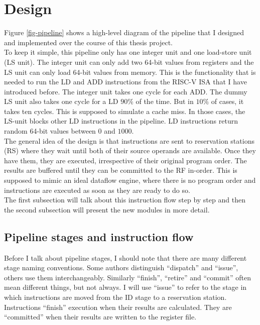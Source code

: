 \documentclass[12pt,a4paper]{article} %
\begin{document}
\section{Design} \label{sec-design}
Figure \ref{fig-pipeline} shows a high-level diagram of the pipeline that I designed and implemented over the course of this thesis project.\\
To keep it simple, this pipeline only has one integer unit and one load-store unit (LS unit). The integer unit can only add two 64-bit values from registers and the LS unit can only load 64-bit values from memory. This is the functionality that is needed to run the LD and ADD instructions from the RISC-V ISA that I have introduced before. The integer unit takes one cycle for each ADD. The dummy LS unit also takes one cycle for a LD $90\%$ of the time. But in $10\%$ of cases, it takes ten cycles. This is supposed to simulate a cache miss. In those cases, the LS-unit blocks other LD instructions in the pipeline. LD instructions return random 64-bit values between $0$ and $1000$. \\

The general idea of the design is that instructions are sent to reservation stations (RS) where they wait until both of their source operands are available. Once they have them, they are executed, irrespective of their original program order. The results are buffered until they can be committed to the RF in-order. This is supposed to mimic an ideal dataflow engine, where there is no program order and instructions are executed as soon as they are ready to do so. \\

The first subsection will talk about this instruction flow step by step and then the second subsection will present the new modules in more detail.

\subsection{Pipeline stages and instruction flow}
Before I talk about pipeline stages, I should note that there are many different stage naming conventions. Some authors distinguish ``dispatch'' and ``issue'', others use them interchangeably. Similarly ``finish'', ``retire'' and ``commit'' often mean different things, but not always. I will use ``issue'' to refer to the stage in which instructions are moved from the ID stage to a reservation station. Instructions ``finish'' execution when their results are calculated. They are ``committed'' when their results are written to the register file.\\
\end{document}
